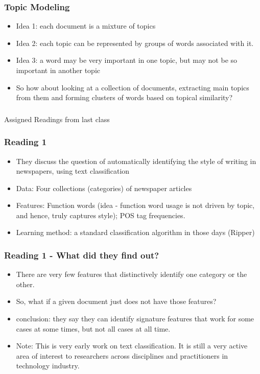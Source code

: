 \documentclass{beamer}
\begin{document}
\begin{frame}
\frametitle{Topic Modeling}
\begin{itemize}
\item Idea 1: each document is a mixture of topics
\item Idea 2: each topic can be represented by groups of words associated with it. \pause
\item Idea 3: a word may be very important in one topic, but may not be so important in another topic \pause
\item So how about looking at a collection of documents, extracting main topics from them and forming clusters of words based on topical similarity?
\end{itemize}
\end{frame}


\begin{frame}
\frametitle{}
\Large Assigned Readings from last class
\end{frame}

\begin{frame}
\frametitle{Reading 1}
\begin{itemize}
\item They discuss the question of automatically identifying the style of writing in newspapers, using text classification
\item Data: Four collections (categories) of newspaper articles
\item Features: Function words (idea - function word usage is not driven by topic, and hence, truly captures style); POS tag frequencies. 
\item Learning method: a standard classification algorithm in those days (Ripper)
\end{itemize}
\end{frame}

\begin{frame}
\frametitle{Reading 1 - What did they find out?}
\begin{itemize}
\item There are very few features that distinctively identify one category or the other.
\item So, what if a given document just does not have those features? 
\item conclusion: they say they can identify signature features that work for some cases at some times, but not all cases at all time. \pause
\item Note: This is very early work on text classification. It is still a very active area of interest to researchers across disciplines and practitioners in technology industry. 
\end{itemize}
\end{frame}
\end{document}

